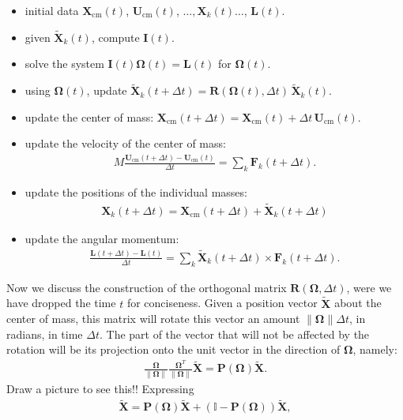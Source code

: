 \documentclass[10pt]{article}
\newcommand{\bs}[1]{{\boldsymbol #1}}
\begin{document}
\begin{itemize}
\item initial data ${\bs X}_\text{cm}(t)$, ${\bs U}_\text{cm}(t)$, $\ldots, {\bs X}_k(t) \ldots$, ${\bs L}(t)$.
\item given $\tilde{{\bs X}}_k(t)$, compute ${\bs I}(t)$.
\item solve the system ${\bs I}(t){\bs \Omega}(t) = {\bs L}(t)$ for ${\bs \Omega}(t)$.
\item using ${\bs \Omega}(t)$, update $\tilde{{\bs X}}_k(t + \Delta t) = {\bs R}({\bs \Omega}(t), \Delta t)\, \tilde{{\bs X}}_k(t)$.
\item update the center of mass: ${\bs X}_\text{cm}(t + \Delta t) = {\bs X}_\text{cm}(t) + \Delta t \, {\bs U}_\text{cm}(t)$.
\item update the velocity of the center of mass:
\begin{align*}
M \frac{{\bs U}_\text{cm}(t + \Delta t) - {\bs U}_\text{cm}(t)}{\Delta t} = \sum_k {\bs F}_k(t + \Delta t).
\end{align*}
\item update the positions of the individual masses:
\begin{align*}
{\bs X}_k(t+\Delta t) = {\bs X}_\text{cm}(t + \Delta t) + \tilde{{\bs X}}_k(t+\Delta t)
\end{align*}
\item update the angular momentum:
\begin{align*}
\frac{{\bs L}(t + \Delta t) - {\bs L}(t)}{\Delta t} = \sum_k \tilde{{\bs X}}_k(t + \Delta t) \times {\bs F}_k(t + \Delta t).
\end{align*}
\end{itemize}
Now we discuss the construction of the orthogonal matrix ${\bs R}({\bs \Omega}, \Delta t)$, were we have dropped the time $t$ for conciseness.  Given a position vector $\tilde{{\bs X}}$ about the center of mass, this matrix will rotate this vector an amount $\|{\bs \Omega}\|\Delta t$, in radians, in time $\Delta t$.  The part of the vector that will not be affected by the rotation will be its projection onto the unit vector in the direction of ${\bs \Omega}$, namely:
\begin{align*}
\frac{{\bs \Omega}}{\|{\bs \Omega}\|} \frac{{\bs \Omega}^T}{\|{\bs \Omega}\|} \tilde{\bs X} = {\bs P}({\bs \Omega}) \tilde{\bs X}.
\end{align*} 
Draw a picture to see this!!  Expressing
\begin{align*}
\tilde{\bs X} = {\bs P}({\bs \Omega}) \tilde{\bs X} + (\mathbb{I} - {\bs P}({\bs \Omega})) \tilde{\bs X},
\end{align*}
\end{document}
